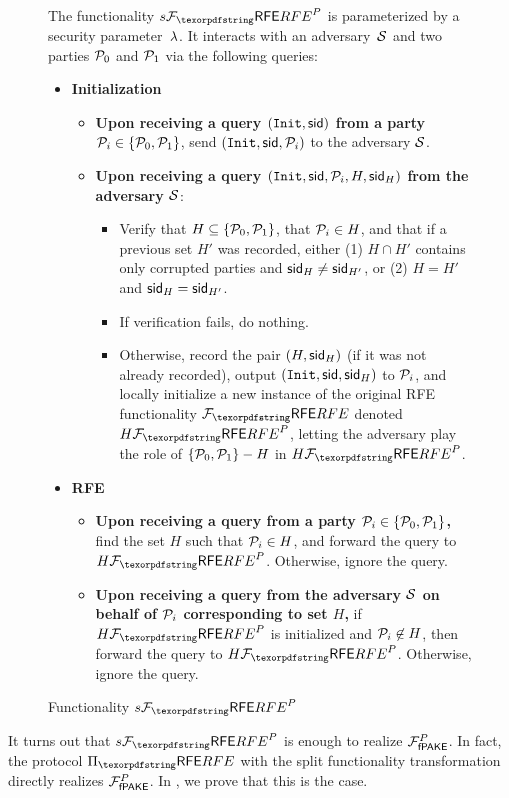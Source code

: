 \begin{figure}[tbp]
  \centering
  \begin{fboxenv}
    \begin{minipage}{0.95\textwidth}
      The functionality $\Fsrfe^{P}$ is parameterized by a security parameter~$\lambda$.
      It interacts with an adversary~$\mathcal{S}$ and two parties $\mathcal{P}_{0}$ and $\mathcal{P}_{1}$ via the following queries:\\[-1.8em]
      \begin{itemize}
      \item \textbf{Initialization}
        \begin{itemize}
        \item
        \textbf{Upon receiving a query $(\texttt{Init}, \mathsf{sid})$ from a party $\mathcal{P}_{i} \in \{\mathcal{P}_{0},\mathcal{P}_{1}\}$}, 
        send $(\texttt{Init}, \mathsf{sid}, \mathcal{P}_{i})$ to the adversary $\mathcal{S}$.
        \item
        \textbf{Upon receiving a query $(\texttt{Init}, \mathsf{sid}, \mathcal{P}_{i}, H, \mathsf{sid}_H)$ from the adversary $\mathcal{S}$}:
          \begin{itemize}
          \item
          Verify that $H \subseteq \{\mathcal{P}_{0}, \mathcal{P}_{1}\}$, that $\mathcal{P}_{i} \in H$, and that if a previous set $H'$ was recorded, either (1) $H \cap H'$ contains only corrupted parties and $\mathsf{sid}_H \neq \mathsf{sid}_{H'}$, or (2) $H = H'$ and $\mathsf{sid}_H = \mathsf{sid}_{H'}$.
          \item
          If verification fails, do nothing.
          \item 
          Otherwise, 
          record the pair $(H, \mathsf{sid}_H)$ (if it was not already recorded), 
          output $(\texttt{Init}, \mathsf{sid}, \mathsf{sid}_H)$ to $\mathcal{P}_{i}$, and
          locally initialize a new instance of the original RFE functionality $\Frfe$ denoted $H\Frfe^{P}$, letting the adversary play the role of $\{\mathcal{P}_{0}, \mathcal{P}_{1}\} - H$ in $H\Frfe^{P}$.
          \end{itemize}
        \end{itemize}
      \item \textbf{RFE}
        \begin{itemize}
        \item
        \textbf{Upon receiving a query from a party $\mathcal{P}_{i} \in \{\mathcal{P}_{0}, \mathcal{P}_{1}\}$,}
        find the set $H$ such that $\mathcal{P}_{i} \in H$, and forward the query to $H\Frfe^{P}$.
        Otherwise, ignore the query.
        \item
        \textbf{Upon receiving a query from the adversary $\mathcal{S}$ on behalf of $\mathcal{P}_{i}$ corresponding to set $H$,}
        if $H\Frfe^{P}$ is initialized and $\mathcal{P}_{i} \not\in H$, then forward the query to $H\Frfe^{P}$.
        Otherwise, ignore the query.
        \end{itemize}
      \end{itemize}
    \end{minipage}
  \end{fboxenv}
  \caption{Functionality $\Fsrfe^{P}$}
  \label{fig:func-SRFE}
\end{figure}

It turns out that $\Fsrfe^{P}$ is enough to realize $\mathcal{F}_\textsf{fPAKE}^{P}$.
In fact, the protocol $\Prfe$ with the split functionality transformation directly realizes $\mathcal{F}_\textsf{fPAKE}^{P}$.
In , we prove that this is the case.
